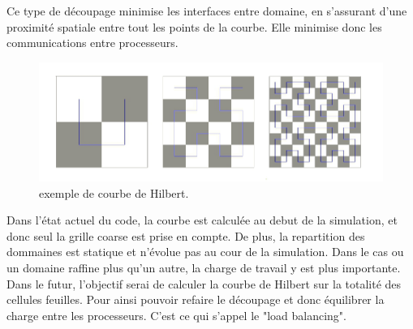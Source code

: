 Ce type de découpage minimise les interfaces entre domaine, en s'assurant d'une proximité spatiale entre tout les points de la courbe.
Elle minimise donc les communications entre processeurs.

\begin{figure}[bth]
        \includegraphics[width=.95\linewidth]{img/02/courbe_Hilbert.jpeg} 
        \caption{exemple de courbe de Hilbert. 
}
 		\label{fig:hilbert}
\end{figure}

%


Dans l'état actuel du code, la courbe est calculée au debut de la simulation, et donc  seul la grille coarse est prise en compte.
De plus, la repartition des dommaines est statique et n'évolue pas au cour de la simulation.
Dans le cas ou un domaine raffine plus qu'un autre, la charge de travail y est plus importante.
Dans le futur, l'objectif serai de calculer la courbe de Hilbert sur la totalité des cellules feuilles.
Pour ainsi pouvoir refaire le découpage et donc équilibrer la charge entre les processeurs.
C'est ce qui s'appel le "load balancing".


